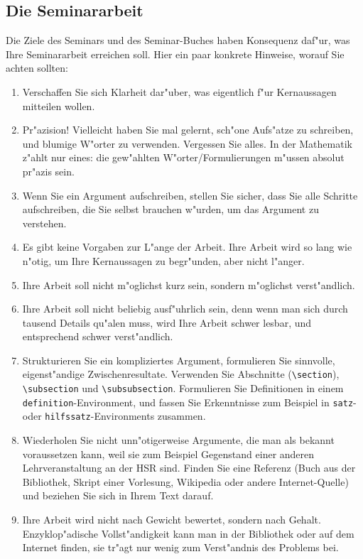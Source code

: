 \documentclass[a4paper]{article}
\begin{document}
\subsection{Die Seminararbeit}
Die Ziele des Seminars und des Seminar-Buches haben Konsequenz daf"ur,
was Ihre Seminararbeit erreichen soll.
Hier ein paar konkrete Hinweise, worauf Sie achten sollten:
\begin{enumerate}
\item
Verschaffen Sie sich Klarheit dar"uber, was eigentlich f"ur Kernaussagen
mitteilen wollen.
\item
Pr"azision! 
Vielleicht haben Sie mal gelernt, sch"one Aufs"atze zu schreiben,
und blumige W"orter zu verwenden. Vergessen Sie alles.
In der Mathematik z"ahlt nur eines: die gew"ahlten W"orter/Formulierungen
m"ussen absolut pr"azis sein.
\item
Wenn Sie ein Argument aufschreiben, stellen Sie sicher, dass Sie alle
Schritte aufschreiben, die Sie selbst brauchen w"urden, um das 
Argument zu verstehen.
\item
Es gibt keine Vorgaben zur L"ange der Arbeit. 
Ihre Arbeit wird so lang wie n"otig, um Ihre Kernaussagen zu
begr"unden, aber nicht l"anger.
\item
Ihre Arbeit soll nicht m"oglichst kurz sein, sondern m"oglichst
verst"andlich.
\item
Ihre Arbeit soll nicht beliebig ausf"uhrlich sein, denn wenn man sich
durch tausend Details qu"alen muss, wird Ihre Arbeit schwer lesbar,
und entsprechend schwer verst"andlich.
\item 
Strukturieren Sie ein kompliziertes Argument, formulieren Sie sinnvolle,
eigenst"andige Zwischenresultate.
Verwenden Sie Abschnitte (\verb+\section+), \verb+\subsection+ und
\verb+\subsubsection+.
Formulieren Sie Definitionen in einem \verb+definition+-Environment,
und fassen Sie Erkenntnisse zum Beispiel in \verb+satz+- oder
\verb+hilfssatz+-Environments zusammen.
\item
Wiederholen Sie nicht unn"otigerweise Argumente, die man als bekannt
voraussetzen kann, weil sie zum Beispiel Gegenstand einer anderen
Lehrveranstaltung an der HSR sind.
Finden Sie eine Referenz (Buch aus der Bibliothek, Skript einer Vorlesung,
Wikipedia oder andere Internet-Quelle) und beziehen Sie sich in
Ihrem Text darauf.
\item
Ihre Arbeit wird nicht nach Gewicht bewertet, sondern nach Gehalt.
Enzyklop"adische Vollst"andigkeit kann man in der Bibliothek oder
auf dem Internet finden, sie tr"agt nur wenig zum Verst"andnis des
Problems bei.
\end{enumerate}
\end{document}
